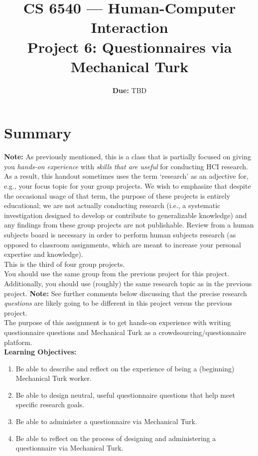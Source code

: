 \documentclass{article}
\title{CS 6540 --- Human-Computer Interaction\\\textbf{Project 6: Questionnaires via Mechanical Turk}}
\author{ }
\date{\textbf{Due:} TBD}
\begin{document}
\maketitle

\section{Summary}
\textbf{Note:} As previously mentioned, this is a class that is partially focused on giving you \textit{hands-on experience} with \textit{skills that are useful} for conducting HCI research. As a result, this handout sometimes uses the term `research' as an adjective for, e.g., your focus topic for your group projects. We wish to emphasize that despite the occasional usage of that term, the purpose of these projects is entirely educational; we are not actually conducting research (i.e., a systematic investigation designed to develop or contribute to generalizable knowledge) and any findings from these group projects are not publishable. Review from a human subjects board is necessary in order to perform human subjects research (as opposed to classroom assignments, which are meant to increase your personal expertise and knowledge).\\

This is the third of four group projects.\\

You should use the same group from the previous project for this project. Additionally, you should use (roughly) the same research topic as in the previous project. \textbf{Note:} See further comments below discussing that the precise research \textit{questions} are likely going to be different in this project versus the previous project.\\

The purpose of this assignment is to get hands-on experience with writing questionnaire questions and Mechanical Turk as a crowdsourcing/questionnaire platform.\\

\textbf{Learning Objectives:}
\begin{enumerate}
    \item Be able to describe and reflect on the experience of being a (beginning) Mechanical Turk worker.
    \item Be able to design neutral, useful questionnaire questions that help meet specific research goals.
    \item Be able to administer a questionnaire via Mechanical Turk.
    \item Be able to reflect on the process of designing and administering a questionnaire via Mechanical Turk.
\end{enumerate}\\
\end{document}
